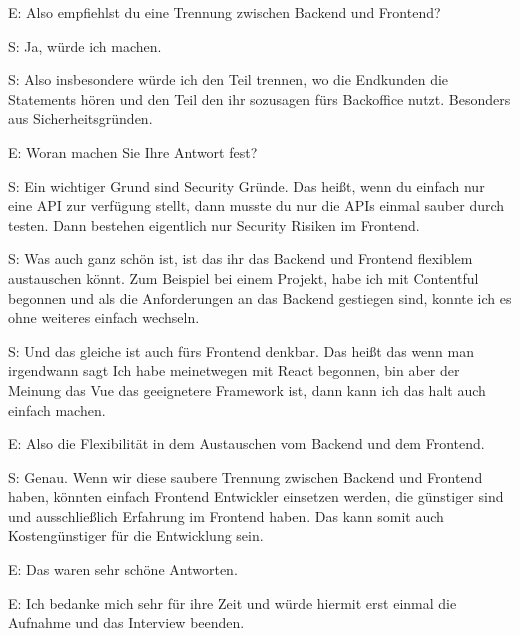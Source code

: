E: Also empfiehlst du eine Trennung zwischen Backend und Frontend?

 \label{appendix:s-35}
S: Ja, würde ich machen.

 \label{appendix:s-36}
S: Also insbesondere würde ich den Teil trennen, wo die Endkunden die Statements hören und den Teil den ihr sozusagen fürs Backoffice nutzt. Besonders aus Sicherheitsgründen.

E: Woran machen Sie Ihre Antwort fest? 

 \label{appendix:s-37}
S: Ein wichtiger Grund sind Security Gründe. Das heißt, wenn du einfach nur eine API zur verfügung stellt, dann musste du nur die APIs einmal sauber durch testen. Dann bestehen eigentlich nur Security Risiken im Frontend.

 \label{appendix:s-38}
S: Was auch ganz schön ist, ist das ihr das Backend und Frontend flexiblem austauschen könnt. Zum Beispiel bei einem Projekt, habe ich mit Contentful begonnen und als die Anforderungen an das Backend gestiegen sind, konnte ich es ohne weiteres einfach wechseln.

S: Und das gleiche ist auch fürs Frontend denkbar. Das heißt das wenn man irgendwann sagt Ich habe meinetwegen mit React begonnen, bin aber der Meinung das Vue das geeignetere Framework ist, dann kann ich das halt auch einfach machen.

E: Also die Flexibilität in dem Austauschen vom Backend und dem Frontend.

 \label{appendix:s-39}
S: Genau. Wenn wir diese saubere Trennung zwischen Backend und Frontend haben, könnten einfach Frontend Entwickler einsetzen werden, die günstiger sind und ausschließlich Erfahrung im Frontend haben. Das kann somit auch Kostengünstiger für die Entwicklung sein.

E: Das waren sehr schöne Antworten.

E: Ich bedanke mich sehr für ihre Zeit und würde hiermit erst einmal die Aufnahme und das Interview beenden.